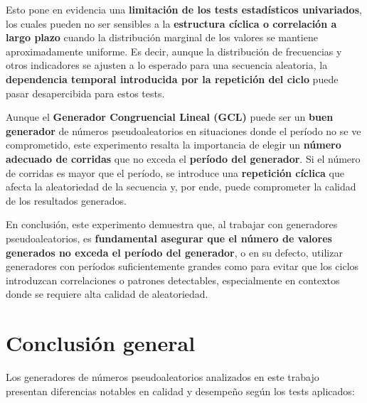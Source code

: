 \documentclass{article}
\begin{document}
Esto pone en evidencia una \textbf{limitación de los tests estadísticos univariados}, los cuales pueden no ser sensibles a la \textbf{estructura cíclica o correlación a largo plazo} cuando la distribución marginal de los valores se mantiene aproximadamente uniforme. Es decir, aunque la distribución de frecuencias y otros indicadores se ajusten a lo esperado para una secuencia aleatoria, la \textbf{dependencia temporal introducida por la repetición del ciclo} puede pasar desapercibida para estos tests.

Aunque el \textbf{Generador Congruencial Lineal (GCL)} puede ser un \textbf{buen generador} de números pseudoaleatorios en situaciones donde el período no se ve comprometido, este experimento resalta la importancia de elegir un \textbf{número adecuado de corridas} que no exceda el \textbf{período del generador}. Si el número de corridas es mayor que el período, se introduce una \textbf{repetición cíclica} que afecta la aleatoriedad de la secuencia y, por ende, puede comprometer la calidad de los resultados generados.

En conclusión, este experimento demuestra que, al trabajar con generadores pseudoaleatorios, es \textbf{fundamental asegurar que el número de valores generados no exceda el período del generador}, o en su defecto, utilizar generadores con períodos suficientemente grandes como para evitar que los ciclos introduzcan correlaciones o patrones detectables, especialmente en contextos donde se requiere alta calidad de aleatoriedad.

\section{Conclusión general}

Los generadores de números pseudoaleatorios analizados en este trabajo presentan diferencias notables en calidad y desempeño según los tests aplicados:
\end{document}
